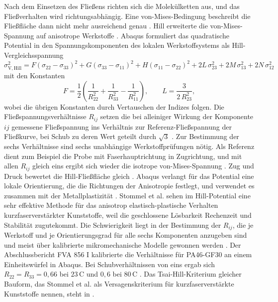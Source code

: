 Nach dem Einsetzen des Fließens richten sich die Molekülketten aus, und das Fließverhalten wird richtungsabhängig. Eine von-Mises-Bedingung beschreibt die Fließfläche dann nicht mehr ausreichend genau \cite[S.~60]{Sto18}. Hill erweiterte die von-Mises-Spannung auf anisotrope Werkstoffe \cite[S.~60]{Sto18}. Abaqus formuliert das quadratische Potential in den Spannungskomponenten des lokalen Werkstoffsystems als Hill-Vergleichsspannung \cite{AbaqusHill25}
\begin{equation}
    \sigma_{\mathrm{V,Hill}}^{2} = F\left(\sigma_{22} - \sigma_{33}\right)^{2} + G\left(\sigma_{33} - \sigma_{11}\right)^{2} + H\left(\sigma_{11} - \sigma_{22}\right)^{2} + 2L\,\sigma_{23}^{2} + 2M\,\sigma_{13}^{2} + 2N\,\sigma_{12}^{2}
    \label{eq:hill_potential}
\end{equation}
mit den Konstanten
\begin{equation}
    F = \frac{1}{2}\left(\frac{1}{R_{22}^{2}} + \frac{1}{R_{33}^{2}} - \frac{1}{R_{11}^{2}}\right) , \qquad
    L = \frac{3}{2\,R_{23}^{2}} ,
    \label{eq:hill_konstanten}
\end{equation}
wobei die übrigen Konstanten durch Vertauschen der Indizes folgen. Die Fließspannungsverhältnisse $R_{ij}$ setzen die bei alleiniger Wirkung der Komponente $ij$ gemessene Fließspannung ins Verhältnis zur Referenz-Fließspannung der Fließkurve, bei Schub zu deren Wert geteilt durch $\sqrt{3}$ \cite{AbaqusHill25}. Zur Bestimmung der sechs Verhältnisse sind sechs unabhängige Werkstoffprüfungen nötig. Als Referenz dient zum Beispiel die Probe mit Faserhauptrichtung in Zugrichtung, und mit allen $R_{ij}$ gleich eins ergibt sich wieder die isotrope von-Mises-Spannung \cite[S.~61]{Sto18}. Zug und Druck bewertet die Hill-Fließfläche gleich \cite[S.~61]{Sto18}. Abaqus verlangt für das Potential eine lokale Orientierung, die die Richtungen der Anisotropie festlegt, und verwendet es zusammen mit der Metallplastizität \cite{AbaqusHill25}. Stommel et al. sehen im Hill-Potential eine sehr effektive Methode für das anisotrop elastisch-plastische Verhalten kurzfaserverstärkter Kunststoffe, weil die geschlossene Lösbarkeit Rechenzeit und Stabilität zugutekommt. Die Schwierigkeit liegt in der Bestimmung der $R_{ij}$, die je Werkstoff und je Orientierungsgrad für alle sechs Komponenten anzugeben sind und meist über kalibrierte mikromechanische Modelle gewonnen werden \cite[S.~129 bis 130]{Sto18}. Der Abschlussbericht FVA 856 I kalibrierte die Verhältnisse für PA46-GF30 an einem Einheitswürfel in Abaqus. Bei Schubverhältnissen von eins ergab sich $R_{22} = R_{33} = 0{,}66$ bei $23$\,\textdegree C und $0{,}6$ bei $80$\,\textdegree C \cite[S.~64]{FVA856-I}. Das Tsai-Hill-Kriterium gleicher Bauform, das Stommel et al. als Versagenskriterium für kurzfaserverstärkte Kunststoffe nennen, steht in  \cite[S.~231 bis 233]{Sto18}.

